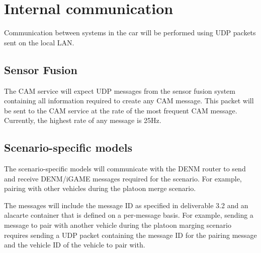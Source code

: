 \documentclass[11pt]{article}
\begin{document}
\section{Internal communication}
\label{sec-4}
Communication between systems in the car will be performed using UDP
packets sent on the local LAN.

\subsection{Sensor Fusion}
\label{sec-4-1}
The CAM service will expect UDP messages from the sensor fusion system
containing all information required to create any CAM message. This
packet will be sent to the CAM service at the rate of the most
frequent CAM message. Currently, the highest rate of any message is
25Hz.

\subsection{Scenario-specific models}
\label{sec-4-2}
The scenario-specific models will communicate with the DENM router to
send and receive DENM/iGAME messages required for the scenario. For
example, pairing with other vehicles during the platoon merge
scenario.

The messages will include the message ID as specified in deliverable
3.2 and an alacarte container that is defined on a per-message basis.
For example, sending a message to pair with another vehicle during the
platoon marging scenario requires sending a UDP packet containing the
message ID for the pairing message and the vehicle ID of the vehicle
to pair with.
\end{document}
